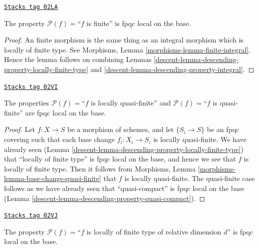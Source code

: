 \begin{lemma}
\label{descent-lemma-descending-property-finite}
\href{https://stacks.math.columbia.edu/tag/02LA}{\texttt{Stacks tag 02LA}}

The property $\mathcal{P}(f) =$``$f$ is finite''
is fpqc local on the base.
\end{lemma}

\begin{proof}

An finite morphism is the same thing as an integral
morphism which is locally of finite type. See
Morphisms, Lemma \ref{morphisms-lemma-finite-integral}.
Hence the lemma follows on combining
Lemmas \ref{descent-lemma-descending-property-locally-finite-type}
and \ref{descent-lemma-descending-property-integral}.
\end{proof}

\begin{lemma}
\label{descent-lemma-descending-property-quasi-finite}
\href{https://stacks.math.columbia.edu/tag/02VI}{\texttt{Stacks tag 02VI}}

The properties
$\mathcal{P}(f) =$``$f$ is locally quasi-finite''
and
$\mathcal{P}(f) =$``$f$ is quasi-finite''
are fpqc local on the base.
\end{lemma}

\begin{proof}

Let $f : X \to S$ be a morphism of schemes, and let $\{S_i \to S\}$
be an fpqc covering such that each base change
$f_i : X_i \to S_i$ is locally quasi-finite.
We have already seen
(Lemma \ref{descent-lemma-descending-property-locally-finite-type})
that ``locally of finite type'' is fpqc local
on the base, and hence we see that $f$ is locally of finite type.
Then it follows from
Morphisms, Lemma \ref{morphisms-lemma-base-change-quasi-finite}
that $f$ is locally quasi-finite. The quasi-finite case follows
as we have already seen that ``quasi-compact'' is fpqc local on the base
(Lemma \ref{descent-lemma-descending-property-quasi-compact}).
\end{proof}

\begin{lemma}
\label{descent-lemma-descending-property-relative-dimension-d}
\href{https://stacks.math.columbia.edu/tag/02VJ}{\texttt{Stacks tag 02VJ}}

The property $\mathcal{P}(f) =$``$f$ is locally of finite type
of relative dimension $d$'' is fpqc local on the base.
\end{lemma}

